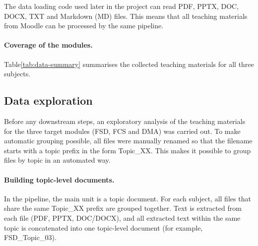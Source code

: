 The data loading code used later in the project can read PDF, PPTX, DOC, DOCX, TXT and Markdown (MD) files. This means that all teaching materials from Moodle can be processed by the same pipeline.

\paragraph{Coverage of the modules.}

Table\ref{tab:data-summary} summarises the collected teaching materials for all three subjects.

\begin{table}[h]
    \centering
    \caption{Summary of collected teaching materials per subject
             (raw files in data/<subject>/raw/).}
    \label{tab:data-summary}
\end{table}

\subsection{Data exploration}
Before any downstream steps, an exploratory analysis of the teaching materials for the three target modules (FSD, FCS and DMA) was carried out. To make automatic grouping possible, all files were manually renamed so that the filename starts with a topic prefix in the form Topic\_XX. This makes it possible to group files by topic in an automated way.

\paragraph{Building topic-level documents.}
In the pipeline, the main unit is a topic document. For each subject, all files that share the same Topic\_XX prefix are grouped together. Text is extracted from each file (PDF, PPTX, DOC/DOCX), and all extracted text within the same topic is concatenated into one topic-level document (for example, FSD\_Topic\_03).

